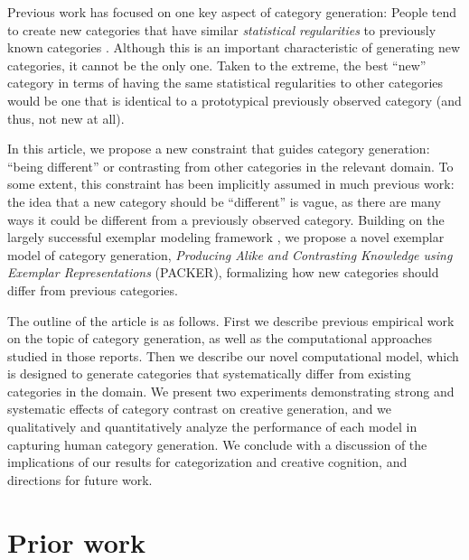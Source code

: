 \documentclass[12pt]{article}
\begin{document}
\begin{flushleft}
Previous work has focused on one key aspect of category generation: People tend to create new categories that have similar {\em statistical regularities} to previously known categories \citep{jern2013probabilistic,ward1994structured}. Although this is an important characteristic of generating new categories, it cannot be the only one. Taken to the extreme, the best ``new'' category in terms of having the same statistical regularities to other categories would be one that is identical to a prototypical previously observed category (and thus, not new at all). 

In this article, we propose a new constraint that guides category generation: ``being different'' or contrasting from other categories in the relevant domain. To some extent, this constraint has been implicitly assumed in much previous work: the idea that a new category should be ``different'' is vague, as there are many ways it could be different from a previously observed category. Building on the largely successful exemplar modeling framework \citep{medin1978context,nosofsky1984choice,nosofsky1986attention}, we propose a novel exemplar model of category generation, {\em Producing Alike and Contrasting Knowledge using Exemplar Representations} (PACKER), formalizing how new categories should differ from previous categories.

The outline of the article is as follows. First we describe previous empirical work on the topic of category generation, as well as the computational approaches studied in those reports. Then we describe our novel computational model, which is designed to generate categories that systematically differ from existing categories in the domain. We present two experiments demonstrating strong and systematic effects of category contrast on creative generation, and we qualitatively and quantitatively analyze the performance of each model in capturing human category generation. We conclude with a discussion of the implications of our results for categorization and creative cognition, and directions for future work.

\section{Prior work}


\end{flushleft}
\end{document}
